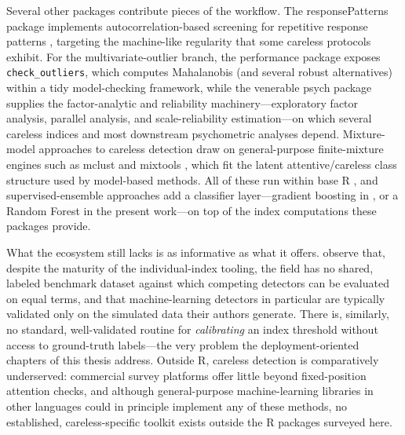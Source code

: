 Several other packages contribute pieces of the workflow. The
\textsf{responsePatterns} package \parencite{rihacek2023responsepatterns}
implements autocorrelation-based screening for repetitive response patterns
\parencite{gottfried2022autocorrelation}, targeting the machine-like regularity
that some careless protocols exhibit. For the multivariate-outlier branch, the
\textsf{performance} package \parencite{ludecke2021performance} exposes
\texttt{check\_outliers}, which computes Mahalanobis (and several robust
alternatives) within a tidy model-checking framework, while the venerable
\textsf{psych} package \parencite{revelle2024psych} supplies the
factor-analytic and reliability machinery---exploratory factor analysis,
parallel analysis, and scale-reliability estimation---on which several careless
indices and most downstream psychometric analyses depend. Mixture-model
approaches to careless detection draw on general-purpose finite-mixture engines
such as \textsf{mclust} \parencite{scrucca2016mclust} and \textsf{mixtools}
\parencite{benaglia2009mixtools}, which fit the latent attentive/careless class
structure used by model-based methods. All of these run within base
\textsf{R} \parencite{rcoreteam2024}, and supervised-ensemble approaches add a
classifier layer---gradient boosting in \textcite{schroeders2022detecting}, or a
Random Forest in the present work---on top of the index computations these
packages provide.

What the ecosystem still lacks is as informative as what it offers.
\textcite{alfons2024openscience} observe that, despite the maturity of the
individual-index tooling, the field has no shared, labeled benchmark dataset
against which competing detectors can be evaluated on equal terms, and that
machine-learning detectors in particular are typically validated only on the
simulated data their authors generate. There is, similarly, no standard,
well-validated routine for \emph{calibrating} an index threshold without access
to ground-truth labels---the very problem the deployment-oriented chapters of
this thesis address. Outside \textsf{R}, careless detection is comparatively
underserved: commercial survey platforms offer little beyond fixed-position
attention checks, and although general-purpose machine-learning libraries in
other languages could in principle implement any of these methods, no
established, careless-specific toolkit exists outside the \textsf{R} packages
surveyed here.

